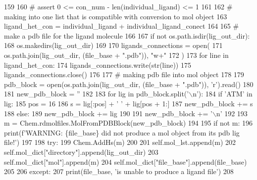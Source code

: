 \begin{DoxyCode}
159 
160         \textcolor{comment}{# assert 0 <= con\_num - len(individual\_ligand) <= 1}
161 
162         \textcolor{comment}{# making into one list that is compatible with conversion to mol object}
163         ligand\_het\_con = individual\_ligand + individual\_ligand\_conect
164 
165         \textcolor{comment}{# make a pdb file for the ligand molecule}
166 
167         \textcolor{keywordflow}{if} \textcolor{keywordflow}{not} os.path.isdir(lig\_out\_dir):
168             os.makedirs(lig\_out\_dir)
169 
170         ligands\_connections = open(
171             os.path.join(lig\_out\_dir, (file\_base + \textcolor{stringliteral}{".pdb"})), \textcolor{stringliteral}{"w+"}
172         )
173         \textcolor{keywordflow}{for} line \textcolor{keywordflow}{in} ligand\_het\_con:
174             ligands\_connections.write(str(line))
175         ligands\_connections.close()
176 
177         \textcolor{comment}{# making pdb file into mol object}
178 
179         pdb\_block = open(os.path.join(lig\_out\_dir, (file\_base + \textcolor{stringliteral}{".pdb"})), \textcolor{stringliteral}{'r').read()}
180 \textcolor{stringliteral}{}
181 \textcolor{stringliteral}{        new\_pdb\_block = ''}
182 
183         \textcolor{keywordflow}{for} lig \textcolor{keywordflow}{in} pdb\_block.split(\textcolor{stringliteral}{'\(\backslash\)n'}):
184             \textcolor{keywordflow}{if} \textcolor{stringliteral}{'ATM'} \textcolor{keywordflow}{in} lig:
185                 pos = 16
186                 s = lig[:pos] + \textcolor{stringliteral}{' '} + lig[pos + 1:]
187                 new\_pdb\_block += s
188             \textcolor{keywordflow}{else}:
189                 new\_pdb\_block += lig
190 
191             new\_pdb\_block += \textcolor{stringliteral}{'\(\backslash\)n'}
192 
193         m = Chem.rdmolfiles.MolFromPDBBlock(new\_pdb\_block)
194 
195         \textcolor{keywordflow}{if} \textcolor{keywordflow}{not} m:
196             print(f\textcolor{stringliteral}{'WARNING: \{file\_base\} did not produce a mol object from its pdb lig file!'})
197 
198         \textcolor{keywordflow}{try}:
199             Chem.AddHs(m)
200 
201             self.mol\_lst.append(m)
202             self.mol\_dict[\textcolor{stringliteral}{"directory"}].append(lig\_out\_dir)
203             self.mol\_dict[\textcolor{stringliteral}{"mol"}].append(m)
204             self.mol\_dict[\textcolor{stringliteral}{"file\_base"}].append(file\_base)
205 
206         \textcolor{keywordflow}{except}:
207             print(file\_base, \textcolor{stringliteral}{'is unable to produce a ligand file'})
208 
\end{DoxyCode}
\mbox{\label{classfragalysis__api_1_1xcimporter_1_1conversion__pdb__mol_1_1_ligand_a9985de5dae739f11768aa6985ccd94bd}} 
